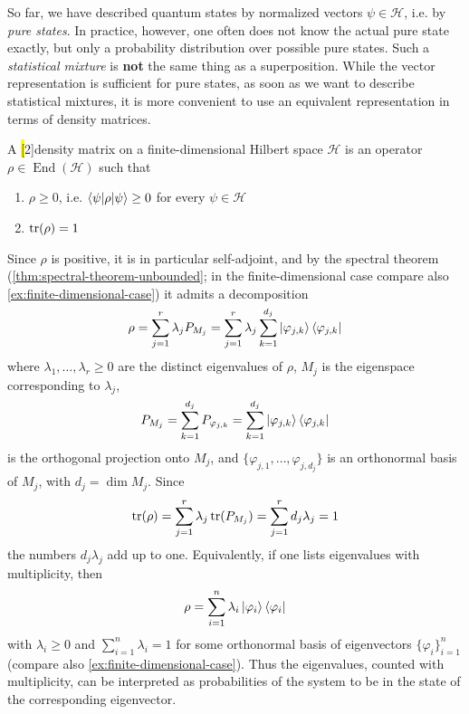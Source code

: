 So far, we have described quantum states by normalized vectors
\(
\psi \in \mathcal H
\),
i.e. by \emph{pure states}.
In practice, however, one often does not know the actual pure state exactly, but only a probability distribution over possible pure states.
Such a \emph{statistical mixture} is \textbf{not} the same thing as a superposition.
While the vector representation is sufficient for pure states, as soon as we want to describe statistical mixtures, it is more convenient to use an equivalent representation in terms of density matrices.

\begin{definition}\label{def:density-matrix}
A \hl[2]{density matrix} on a finite-dimensional Hilbert space \(\mathcal H\) is an operator
\(
\rho \in \operatorname{End}(\mathcal H)
\)
such that
\begin{enumerate}[label=(\alph*)]
\item 
\(\rho \ge 0\), i.e. \(\braket{\psi|\rho|\psi} \ge 0\) for every \(\psi \in \mathcal H\)
\item 
\(\operatorname{tr}(\rho)=1\)
\qedhere
\end{enumerate}
\end{definition}

Since \(\rho\) is positive, it is in particular self-adjoint, and by the spectral theorem (\autoref{thm:spectral-theorem-unbounded}; in the finite-dimensional case compare also \autoref{ex:finite-dimensional-case}) it admits a decomposition
\[
\rho
=
\sum_{j=1}^r \lambda_j P_{M_j}
=
\sum_{j=1}^r \lambda_j \sum_{k=1}^{\smash[t]{d}_j} \ket{\varphi_{j,k}}\bra{\varphi_{j,k}}
\]
where \(\lambda_1,\dots,\lambda_r\ge 0\) are the distinct eigenvalues of \(\rho\),
\(M_j\) is the eigenspace corresponding to \(\lambda_j\),
\begin{equation}\label{eq:projector-eigenspace}
P_{M_j} = \sum_{k=1}^{\smash[t]{d}_j} P_{\varphi_{j,k}} = \sum_{k=1}^{\smash[t]{d}_j} \ket{\varphi_{j,k}}\bra{\varphi_{j,k}}
\end{equation}
is the orthogonal projection onto \(M_j\),
and
\(
\{\varphi_{j,1},\dots,\varphi_{j,d_j}\}
\)
is an orthonormal basis of \(M_j\), with
\(
d_j = \dim M_j
\).
Since
\[
\operatorname{tr}(\rho)
=
\sum_{j=1}^r \lambda_j  \operatorname{tr}(P_{M_j})
=
\sum_{j=1}^r d_j \lambda_j
=
1
\]
the numbers \(d_j\lambda_j\) add up to one. 
Equivalently, if one lists eigenvalues with multiplicity, then
\[
\rho 
= 
\sum_{i=1}^n \lambda_i \ket{\varphi_i}\bra{\varphi_i}
\]
with
\(
\lambda_i \ge 0
\)
and
\(
\sum_{i=1}^n \lambda_i = 1
\)
for some orthonormal basis of eigenvectors \(\{\varphi_i\}_{i=1}^n\) (compare also \autoref{ex:finite-dimensional-case}).
Thus the eigenvalues, counted with multiplicity, can be interpreted as probabilities of the system to be in the state of the corresponding eigenvector.

